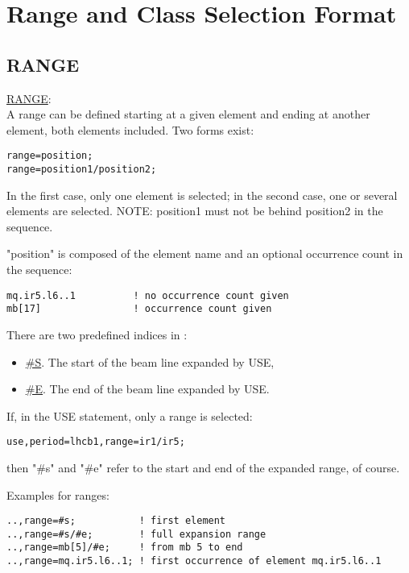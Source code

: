 
\chapter{Range and Class Selection Format}

\section{RANGE}
\label{sec:range}

 \href{range}{RANGE}: \\
A range can be defined starting at  a given element and ending at
another element, both elements included. Two forms exist:  

\begin{verbatim}
range=position;
range=position1/position2;
\end{verbatim} 

In the first case, only one element is selected; in the second case, one
or several elements are selected. NOTE: position1 must not be behind
position2 in the sequence.  

"position" is composed of the element name and an optional occurrence count in the sequence: 
\label{range_position}
\begin{verbatim}
mq.ir5.l6..1          ! no occurrence count given
mb[17]                ! occurrence count given
\end{verbatim} 

There are two predefined indices in \madx: 
\begin{itemize}
   \item \href{s}{\#S}. The start of the beam line expanded by USE, 
   \item \href{e}{\#E}. The end of the beam line expanded by USE. 
\end{itemize} 

If, in the USE statement, only a range is selected: 
\begin{verbatim}
use,period=lhcb1,range=ir1/ir5;
\end{verbatim} 
then "\#s" and "\#e" refer to the start and end of the expanded range, of course. 

 Examples for ranges: 
\begin{verbatim}
..,range=#s;           ! first element
..,range=#s/#e;        ! full expansion range
..,range=mb[5]/#e;     ! from mb 5 to end
..,range=mq.ir5.l6..1; ! first occurrence of element mq.ir5.l6..1
\end{verbatim}

